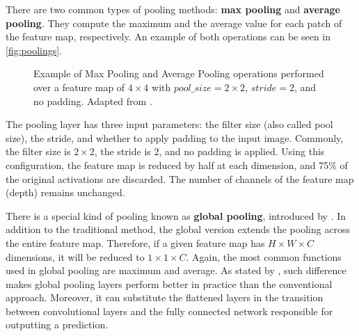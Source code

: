 There are two common types of pooling methods: \textbf{max pooling} and \textbf{average pooling}. They compute the maximum and the average value for each patch of the feature map, respectively. An example of both operations can be seen in \autoref{fig:poolings}.

\begin{figure}[ht]
\centering
{}
\hfill
{}    
\caption{Example of Max Pooling and Average Pooling operations performed over a feature map of $4 \times 4$ with $pool\_size=2 \times 2$, $stride=2$, and no padding. Adapted from \citep{guissousallaeddine2019}.}
\label{fig:poolings}
\end{figure}

The pooling layer has three input parameters: the filter size (also called pool size), the stride, and whether to apply padding to the input image. Commonly, the filter size is $2 \times 2$, the stride is 2, and no padding is applied. Using this configuration, the feature map is reduced by half at each dimension, and 75\% of the original activations are discarded. The number of channels of the feature map (depth) remains unchanged.

There is a special kind of pooling known as \textbf{global pooling}, introduced by \cite{lin2013network}. In addition to the traditional method, the global version extends the pooling across the entire feature map. Therefore, if a given feature map has $H \times W \times C$ dimensions, it will be reduced to $1 \times 1 \times C$. Again, the most common functions used in global pooling are maximum and average. As stated by \cite{zhou2016learning}, such difference makes global pooling layers perform better in practice than the conventional approach. Moreover, it can substitute the flattened layers in the transition between convolutional layers and the fully connected network responsible for outputting a prediction.


